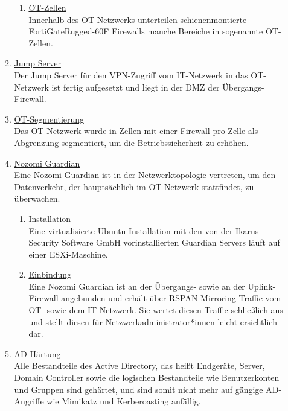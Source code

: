 \documentclass[
	headings=optiontotocandhead,%
	oneside,
	numbers=noenddot,%
	toc=flat, %
	10pt, %
	parskip=full, %
	listof=totoc, %
	listof=flat, %
	numbers=noenddot, %
	bibliography=totoc, %
	a4paper,DIV=14,
]{scrartcl}
\begin{document}
\begin{enumerate}[start=1,label={\bfseries Ziel-H \arabic*},leftmargin=*,wide]
\begin{enumerate}[label=\alph*.]
\begin{enumerate}[label=\roman*.]
\item{\underline{OT-Zellen}}\\
Innerhalb des OT-Netzwerks unterteilen schienenmontierte FortiGateRugged-60F Firewalls manche Bereiche in sogenannte OT-Zellen.
\end{enumerate}

\item{\underline{Jump Server}}\\
Der Jump Server für den VPN-Zugriff vom IT-Netzwerk in das OT-Netzwerk ist fertig aufgesetzt und liegt in der DMZ der Übergangs-Firewall.

\item{\underline{OT-Segmentierung}}\\
Das OT-Netzwerk wurde in Zellen mit einer Firewall pro Zelle als Abgrenzung segmentiert, um die Betriebssicherheit zu erhöhen.

\item{\underline{Nozomi Guardian}}\\
Eine Nozomi Guardian ist in der Netzwerktopologie vertreten, um den Datenverkehr, der hauptsächlich im OT-Netzwerk stattfindet, zu überwachen.
\begin{enumerate}[label=\roman*.]
\item{\underline{Installation}}\\
Eine virtualisierte Ubuntu-Installation mit den von der Ikarus Security Software GmbH vorinstallierten Guardian Servers läuft auf einer ESXi-Maschine.

\item{\underline{Einbindung}}\\
Eine Nozomi Guardian ist an der Übergangs- sowie an der Uplink-Firewall angebunden und erhält über RSPAN-Mirroring Traffic vom OT- sowie dem IT-Netzwerk. Sie wertet diesen Traffic schließlich aus und stellt diesen für Netzwerkadministrator*innen leicht ersichtlich dar.
\end{enumerate}

\item{\underline{AD-Härtung}}\\
Alle Bestandteile des Active Directory, das heißt Endgeräte, Server, Domain Controller sowie die logischen Bestandteile wie Benutzerkonten und Gruppen sind gehärtet, und sind somit nicht mehr auf gängige AD-Angriffe wie Mimikatz und Kerberoasting anfällig.
\end{enumerate}


\end{enumerate}
\end{document}
